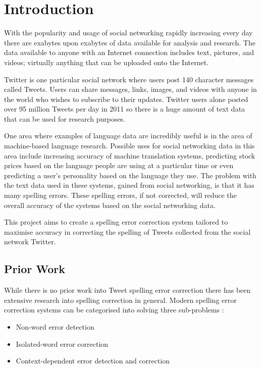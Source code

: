 \chapter{Introduction}
With the popularity and usage of social networking rapidly increasing every day there are exabytes upon exabytes of data available for analysis and research. The data available to anyone with an Internet connection includes text, pictures, and videos; virtually anything that can be uploaded onto the Internet.

Twitter is one particular social network where users post 140 character messages called Tweets. Users can share messages, links, images, and videos with anyone in the world who wishes to subscribe to their updates. Twitter users alone posted over 95 million Tweets per day in 2011 \cite{} so there is a huge amount of text data that can be used for research purposes.

One area where examples of language data are incredibly useful is in the area of machine-based language research. Possible uses for social networking data in this area include increasing accuracy of machine translation systems, predicting stock prices based on the language people are using at a particular time or even predicting a user's personality based on the language they use. The problem with the text data used in these systems, gained from social networking, is that it has many spelling errors. These spelling errors, if not corrected, will reduce the overall accuracy of the systems based on the social networking data.

This project aims to create a spelling error correction system tailored to maximise accuracy in correcting the spelling of Tweets collected from the social network Twitter.

\section{Prior Work}
While there is no prior work into Tweet spelling error correction there has been extensive research into spelling correction in general. Modern spelling error correction systems can be categorised into solving three sub-problems \cite{Kukich1992}:

\begin{itemize}
\item
Non-word error detection
\item
Isolated-word error correction
\item
Context-dependent error detection and correction
\end{itemize}

